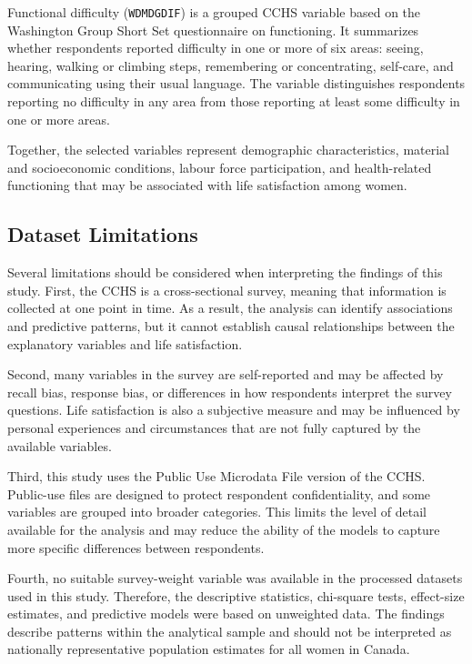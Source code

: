\documentclass[12pt]{article}
\begin{document}
Functional difficulty (\texttt{WDMDGDIF}) is a grouped CCHS variable based on the Washington Group Short Set questionnaire on functioning. It summarizes whether respondents reported difficulty in one or more of six areas: seeing, hearing, walking or climbing steps, remembering or concentrating, self-care, and communicating using their usual language. The variable distinguishes respondents reporting no difficulty in any area from those reporting at least some difficulty in one or more areas.

Together, the selected variables represent demographic characteristics, material and socioeconomic conditions, labour force participation, and health-related functioning that may be associated with life satisfaction among women.

\subsection{Dataset Limitations}

Several limitations should be considered when interpreting the findings of this study. First, the CCHS is a cross-sectional survey, meaning that information is collected at one point in time. As a result, the analysis can identify associations and predictive patterns, but it cannot establish causal relationships between the explanatory variables and life satisfaction.

Second, many variables in the survey are self-reported and may be affected by recall bias, response bias, or differences in how respondents interpret the survey questions. Life satisfaction is also a subjective measure and may be influenced by personal experiences and circumstances that are not fully captured by the available variables.

Third, this study uses the Public Use Microdata File version of the CCHS. Public-use files are designed to protect respondent confidentiality, and some variables are grouped into broader categories. This limits the level of detail available for the analysis and may reduce the ability of the models to capture more specific differences between respondents.

Fourth, no suitable survey-weight variable was available in the
processed datasets used in this study. Therefore, the descriptive
statistics, chi-square tests, effect-size estimates, and predictive
models were based on unweighted data. The findings describe patterns
within the analytical sample and should not be interpreted as nationally
representative population estimates for all women in Canada.
\end{document}
